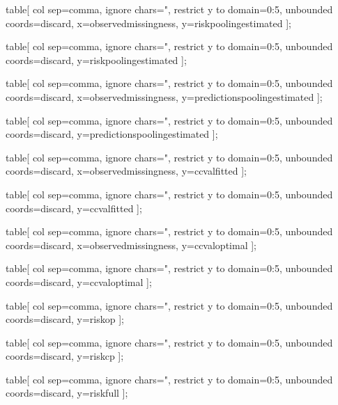   table[
    col sep=comma,
    ignore chars={"},
    restrict y to domain=0:5,
    unbounded coords=discard,
    x=observedmissingness,
    y=riskpoolingestimated
  ]{\pointsfile};

  table[
    col sep=comma,
    ignore chars={"},
    restrict y to domain=0:5,
    unbounded coords=discard,
    y=riskpoolingestimated
  ]{\loessfile};

  table[
    col sep=comma,
    ignore chars={"},
    restrict y to domain=0:5,
    unbounded coords=discard,
    x=observedmissingness,
    y=predictionspoolingestimated
  ]{\pointsfile};

  table[
    col sep=comma,
    ignore chars={"},
    restrict y to domain=0:5,
    unbounded coords=discard,
    y=predictionspoolingestimated
  ]{\loessfile};

  table[
    col sep=comma,
    ignore chars={"},
    restrict y to domain=0:5,
    unbounded coords=discard,
    x=observedmissingness,
    y=ccvalfitted
  ]{\pointsfile};

  table[
    col sep=comma,
    ignore chars={"},
    restrict y to domain=0:5,
    unbounded coords=discard,
    y=ccvalfitted
  ]{\loessfile};

  table[
    col sep=comma,
    ignore chars={"},
    restrict y to domain=0:5,
    unbounded coords=discard,
    x=observedmissingness,
    y=ccvaloptimal
  ]{\pointsfile};

  table[
    col sep=comma,
    ignore chars={"},
    restrict y to domain=0:5,
    unbounded coords=discard,
    y=ccvaloptimal
  ]{\loessfile};

\fi


table[
  col sep=comma,
  ignore chars={"},
  restrict y to domain=0:5,
  unbounded coords=discard,
  y=riskop
]{\loessfile};

table[
  col sep=comma,
  ignore chars={"},
  restrict y to domain=0:5,
  unbounded coords=discard,
  y=riskcp
]{\loessfile};

table[
  col sep=comma,
  ignore chars={"},
  restrict y to domain=0:5,
  unbounded coords=discard,
  y=riskfull
]{\loessfile};
